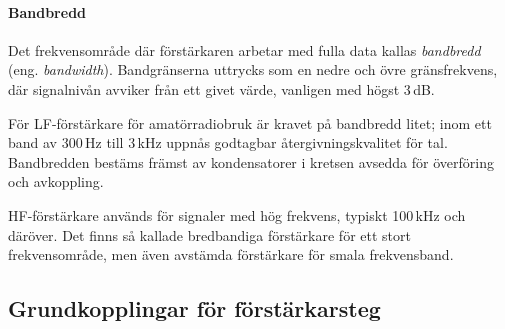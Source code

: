 \paragraph{Bandbredd}

Det frekvensområde där förstärkaren arbetar med fulla data kallas
\emph{bandbredd} (eng. \emph{bandwidth}).
Bandgränserna uttrycks som en nedre och övre gränsfrekvens, där signalnivån
avviker från ett givet värde, vanligen med högst 3\,dB.

För LF-förstärkare för amatörradiobruk är kravet på bandbredd litet; inom ett
band av 300\,Hz till 3\,kHz uppnås godtagbar återgivningskvalitet för tal.
Bandbredden bestäms främst av kondensatorer i kretsen avsedda för överföring
och avkoppling.

HF-förstärkare används för signaler med hög frekvens, typiskt 100\,kHz och
däröver.
Det finns så kallade bredbandiga förstärkare för ett stort frekvensområde, men
även avstämda förstärkare för smala frekvensband.

\subsection{Grundkopplingar för förstärkarsteg}

